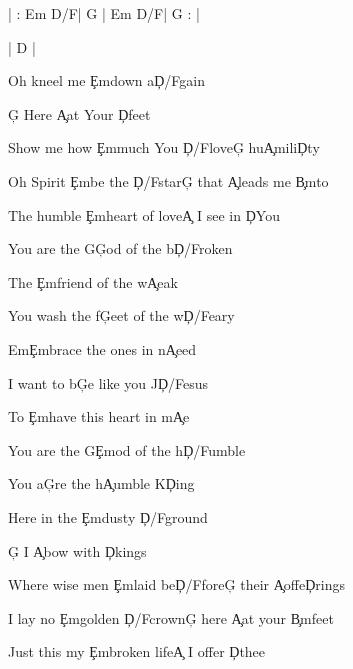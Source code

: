 \documentclass[9pt]{extarticle}
\begin{document}
\bsong

\bi
| : Em D/F\s   | G |  Em D/F\s   | G : |

| D |
\ei

\bv
Oh kneel me \c{Em}down a\c{D/F\s }gain

\c{G} Here \c{A}at Your \c{D}feet

Show me how \c{Em}much You \c{D/F\s }love\c{G} hu\c{A}mili\c{D}ty

Oh Spirit \c{Em}be the \c{D/F\s }star\c{G} that \c{A}leads me \c{Bm}to

The humble \c{Em}heart of love\c{A} I see in \c{D}You
\ev

\bc
You are the G\c{G}od of the b\c{D/F\s }roken

The \c{Em}friend of the w\c{A}eak

You wash the f\c{G}eet of the w\c{D/F\s }eary

Em\c{Em}brace the ones in n\c{A}eed



I want to b\c{G}e like you J\c{D/F\s }esus

To \c{Em}have this heart in m\c{A}e

You are the G\c{Em}od of the h\c{D/F\s }umble

You a\c{G}re the h\c{A}umble K\c{D}ing
\ec

\bv
Here in the \c{Em}dusty \c{D/F\s }ground

\c{G} I \c{A}bow with \c{D}kings

Where wise men \c{Em}laid be\c{D/F\s }fore\c{G} their \c{A}offe\c{D}rings

I lay no \c{Em}golden \c{D/F\s }crown\c{G} here \c{A}at your \c{Bm}feet

Just this my \c{Em}broken life\c{A} I offer \c{D}thee
\ev


\esong
\end{document}
